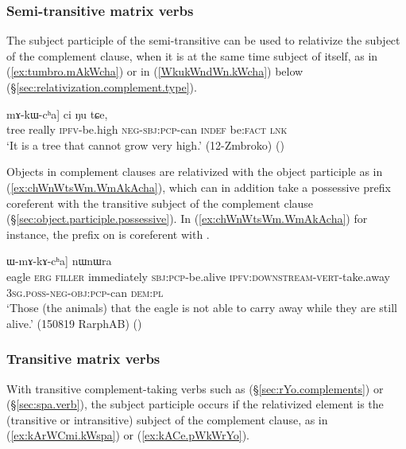 \subsubsection{Semi-transitive matrix verbs} \label{sec:out.complement.relativization.cha}
The subject participle of the semi-transitive  can be used to relativize the subject of the complement clause, when it is at the same time subject of  itself, as in (\ref{ex:tumbro.mAkWcha}) or in (\ref{WkukWndWn.kWcha}) below (§\ref{sec:relativization.complement.type}).
 
\begin{exe}
\ex \label{ex:tumbro.mAkWcha}
\gll [\textbf{si} [wuma tu-mbro] mɤ-kɯ-cʰa] ci ŋu tɕe, \\
tree really \textsc{ipfv}-be.high \textsc{neg}-\textsc{sbj}:\textsc{pcp}-can \textsc{indef} be:\textsc{fact} \textsc{lnk} \\
\glt `It is a tree that cannot grow very high.' (12-Zmbroko)
()
\end{exe}


Objects in complement clauses are relativized with the object participle  as in (\ref{ex:chWnWtsWm.WmAkAcha}), which can in addition take a possessive prefix coreferent with the transitive subject of the complement clause (§\ref{sec:object.participle.possessive}). In (\ref{ex:chWnWtsWm.WmAkAcha}) for instance, the prefix  on  is coreferent with .

\begin{exe}
\ex \label{ex:chWnWtsWm.WmAkAcha}
\gll [[qaliaʁ kɯ, nɤkinɯ, nɯɕimɯma kɯ-sɯsu cʰɯ-nɯ-tsɯm] ɯ-mɤ-kɤ-cʰa] nɯnɯra \\
eagle \textsc{erg} \textsc{filler} immediately \textsc{sbj}:\textsc{pcp}-be.alive \textsc{ipfv}:\textsc{downstream}-\textsc{vert}-take.away \textsc{3sg}.\textsc{poss}-\textsc{neg}-\textsc{obj}:\textsc{pcp}-can \textsc{dem}:\textsc{pl} \\
\glt `Those (the animals) that the eagle is not able to carry away while they are still alive.' (150819 RarphAB)
()
\end{exe}

\subsubsection{Transitive matrix verbs} \label{sec:out.complement.relativization.tr}
With transitive com\-ple\-ment-taking verbs such as  (§\ref{sec:rYo.complements}) or  (§\ref{sec:spa.verb}), the subject participle occurs if the relativized element is the (transitive or intransitive) subject of the complement clause, as in (\ref{ex:kArWCmi.kWspa}) or (\ref{ex:kACe.pWkWrYo}).

